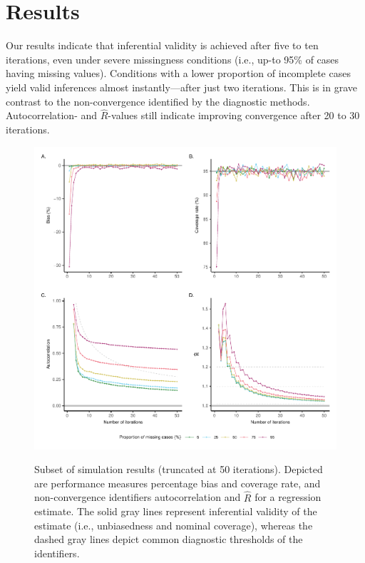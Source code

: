 \documentclass{article}
\begin{document}
\section{Results}
\label{results}

Our results indicate that inferential validity is achieved after five to ten iterations, even under severe missingness conditions (i.e., up-to 95\% of cases having missing values). Conditions with a lower proportion of incomplete cases yield valid inferences almost instantly---after just two iterations. This is in grave contrast to the non-convergence identified by the diagnostic methods. Autocorrelation- and $\widehat{R}$-values still indicate improving convergence after 20 to 30 iterations. 


\begin{figure}
{\centering \includegraphics{Figures/resultssquare} 
}
\caption{Subset of simulation results (truncated at 50 iterations). Depicted are performance measures percentage bias and coverage rate, and non-convergence identifiers autocorrelation and $\widehat{R}$ for a regression estimate. The solid gray lines represent inferential validity of the estimate (i.e., unbiasedness and nominal coverage), whereas the dashed gray lines depict common diagnostic thresholds of the identifiers.}\label{fig:res}
\end{figure}
\end{document}
